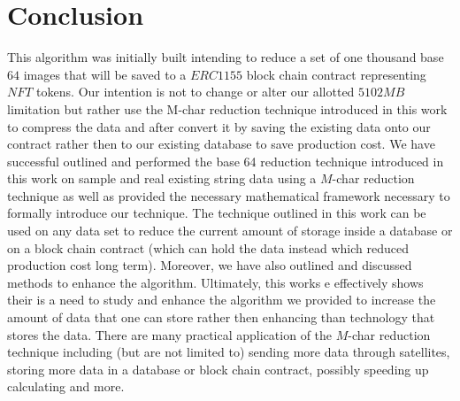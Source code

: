 \documentclass[amsmath,12pt,a4paper]{amsart}
\begin{document}
\section{Conclusion}
This algorithm was initially built intending to reduce a set of one thousand base $64$ images that will be saved to a $ERC1155$ block chain contract representing $NFT$ tokens. Our intention is not to change or alter our allotted $5102MB$ limitation but rather use the M-char reduction technique introduced in this work to compress the data and after convert it by saving the existing data onto our contract rather then to our existing database to save production cost. We have successful outlined and performed the base 64 reduction technique introduced in this work on sample and real existing string data using a $M$-char reduction technique as well as provided the necessary mathematical framework necessary to formally introduce our technique. The technique outlined in this work can be used on any data set to reduce the current amount of storage inside a database or on a block chain contract (which can hold the data instead which reduced production cost long term). Moreover, we have also outlined and discussed methods to enhance the algorithm. Ultimately, this works e effectively shows their is a need to study and enhance the algorithm we provided to increase the amount of data that one can store rather then enhancing than technology that stores the data. There are many practical application of the $M$-char reduction technique including (but are not limited to) sending more data through satellites, storing more data in a database or block chain contract, possibly speeding up calculating and more.
\end{document}
